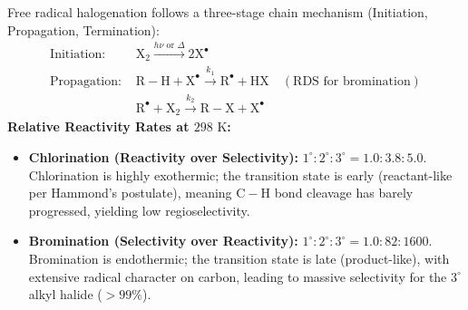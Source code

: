 \documentclass[10pt,twoside,openright]{book}
\begin{document}
\begin{formulabox}
Free radical halogenation follows a three-stage chain mechanism (Initiation, Propagation, Termination):
\begin{align}
  \text{Initiation: } & \mathrm{X_2} \xrightarrow{h\nu \text{ or } \Delta} 2\mathrm{X}^\bullet\\
  \text{Propagation: } & \mathrm{R-H} + \mathrm{X}^\bullet \xrightarrow{k_1} \mathrm{R}^\bullet + \mathrm{HX} \quad (\text{RDS for bromination})\\
  & \mathrm{R}^\bullet + \mathrm{X_2} \xrightarrow{k_2} \mathrm{R-X} + \mathrm{X}^\bullet
\end{align}
\textbf{Relative Reactivity Rates at $298\text{ K}$:}
\begin{itemize}
  \item \textbf{Chlorination (Reactivity over Selectivity):} $1^\circ : 2^\circ : 3^\circ = 1.0 : 3.8 : 5.0$. Chlorination is highly exothermic; the transition state is early (reactant-like per Hammond's postulate), meaning $\mathrm{C-H}$ bond cleavage has barely progressed, yielding low regioselectivity.
  \item \textbf{Bromination (Selectivity over Reactivity):} $1^\circ : 2^\circ : 3^\circ = 1.0 : 82 : 1600$. Bromination is endothermic; the transition state is late (product-like), with extensive radical character on carbon, leading to massive selectivity for the $3^\circ$ alkyl halide ($> 99\%$).
\end{itemize}
\end{formulabox}
\end{document}
